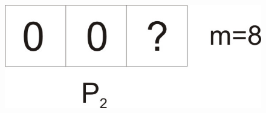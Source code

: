 \begin{frame}
\vspace{-1.5mm}
\begin{figure}[t]
		\includegraphics{figures/SlotMach3.jpg}
\end{figure}
\end{frame}

